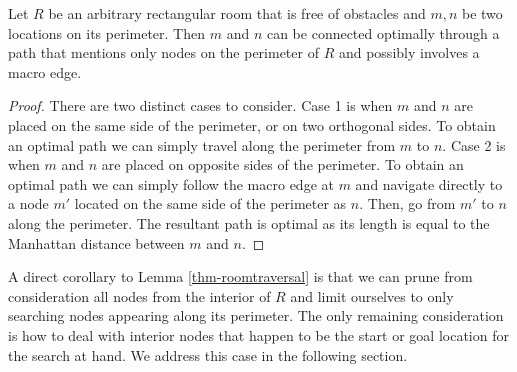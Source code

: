 \begin{lemma}
\label{thm-roomtraversal}
Let $R$ be an arbitrary rectangular room that is free of obstacles
and $m, n$ be two locations on its perimeter.
Then $m$ and $n$ can be connected optimally through a path that
mentions only nodes on the perimeter of $R$ and possibly involves
a macro edge.
\end{lemma}
\begin{proof}
\par
There are two distinct cases to consider.
Case 1 is when $m$ and $n$ are placed on the same side of the perimeter, or
on two orthogonal sides. 
To obtain an optimal path we can simply travel along the perimeter from $m$ to $n$.
Case 2 is when $m$ and $n$ are placed on opposite sides of the perimeter.
To obtain an optimal path we can simply follow the macro edge at $m$ 
and navigate directly to a node $m'$ located on
the same side of the perimeter as $n$. Then, go from $m'$ to $n$ along the perimeter.
The resultant path is optimal as its length is equal to the Manhattan distance between $m$ and $n$.
\end{proof}

A direct corollary to Lemma \ref{thm-roomtraversal} is that we can prune from consideration
all nodes from the interior of $R$ and limit ourselves to only searching nodes appearing along its perimeter. 
The only remaining consideration is how to deal with interior nodes that happen
to be the start or goal location for the search at hand.
We address this case in the following section.


